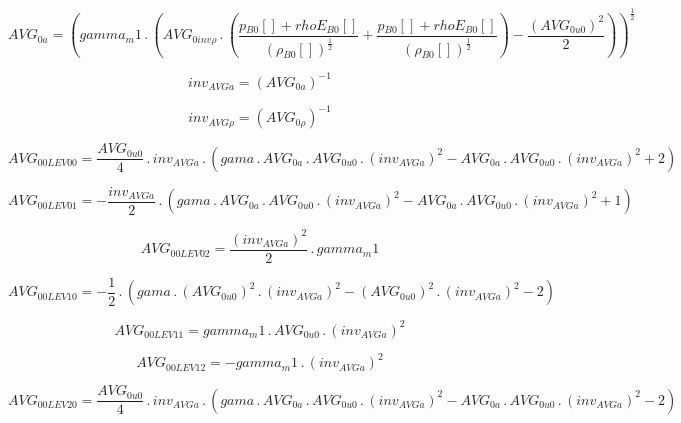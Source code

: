 \documentclass{article}
\begin{document}
\begin{dmath}AVG_{0 a} = \left(gamma_m1 \,.\, \left(AVG_{0 inv \rho} \,.\, \left(\frac{{p{_{B0}}}[{}] + {rhoE{_{B0}}}[{}]}{\left({\rho{_{B0}}}[{}] \right)^{\frac{1}{2}}} + \frac{{p{_{B0}}}[{}] + {rhoE{_{B0}}}[{}]}{\left({\rho{_{B0}}}[{}] 
\right)^{\frac{1}{2}}}\right) - \frac{\left(AVG_{0 u0} \right)^{2}}{2}\right) \right)^{\frac{1}{2}}\end{dmath}

\begin{dmath}inv_{AVG a} = \left(AVG_{0 a} \right)^{-1}\end{dmath}

\begin{dmath}inv_{AVG \rho} = \left(AVG_{0 \rho} \right)^{-1}\end{dmath}

\begin{dmath}AVG_{0 0 LEV 00} = \frac{AVG_{0 u0}}{4} \,.\, inv_{AVG a} \,.\, \left(gama \,.\, AVG_{0 a} \,.\, AVG_{0 u0} \,.\, \left(inv_{AVG a} \right)^{2} - AVG_{0 a} \,.\, AVG_{0 u0} \,.\, \left(inv_{AVG a} \right)^{2} + 2\right)\end{dmath}

\begin{dmath}AVG_{0 0 LEV 01} = - \frac{inv_{AVG a}}{2} \,.\, \left(gama \,.\, AVG_{0 a} \,.\, AVG_{0 u0} \,.\, \left(inv_{AVG a} \right)^{2} - AVG_{0 a} \,.\, AVG_{0 u0} \,.\, \left(inv_{AVG a} \right)^{2} + 1\right)\end{dmath}

\begin{dmath}AVG_{0 0 LEV 02} = \frac{\left(inv_{AVG a} \right)^{2}}{2} \,.\, gamma_m1\end{dmath}

\begin{dmath}AVG_{0 0 LEV 10} = - \frac{1}{2} \,.\, \left(gama \,.\, \left(AVG_{0 u0} \right)^{2} \,.\, \left(inv_{AVG a} \right)^{2} - \left(AVG_{0 u0} \right)^{2} \,.\, \left(inv_{AVG a} \right)^{2} - 2\right)\end{dmath}

\begin{dmath}AVG_{0 0 LEV 11} = gamma_m1 \,.\, AVG_{0 u0} \,.\, \left(inv_{AVG a} \right)^{2}\end{dmath}

\begin{dmath}AVG_{0 0 LEV 12} = - gamma_m1 \,.\, \left(inv_{AVG a} \right)^{2}\end{dmath}

\begin{dmath}AVG_{0 0 LEV 20} = \frac{AVG_{0 u0}}{4} \,.\, inv_{AVG a} \,.\, \left(gama \,.\, AVG_{0 a} \,.\, AVG_{0 u0} \,.\, \left(inv_{AVG a} \right)^{2} - AVG_{0 a} \,.\, AVG_{0 u0} \,.\, \left(inv_{AVG a} \right)^{2} - 2\right)\end{dmath}
\end{document}
